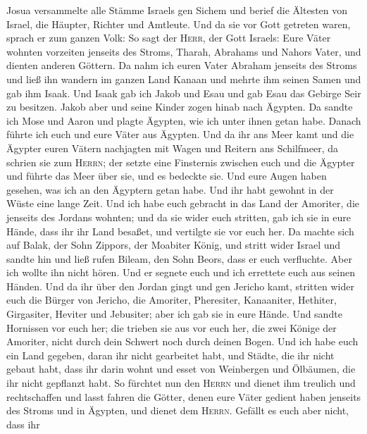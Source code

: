  Josua versammelte alle Stämme Israels gen Sichem und
berief die Ältesten von Israel, die Häupter, Richter und Amtleute. Und
da sie vor Gott getreten waren,  sprach er zum ganzen
Volk: So sagt der \textsc{Herr}, der Gott Israels: Eure Väter wohnten
vorzeiten jenseits des Stroms, Tharah, Abrahams und Nahors Vater, und
dienten anderen Göttern.  Da nahm ich euren Vater Abraham
jenseits des Stroms und ließ ihn wandern im ganzen Land Kanaan und
mehrte ihm seinen Samen und gab ihm Isaak.  Und Isaak gab
ich Jakob und Esau und gab Esau das Gebirge Seir zu besitzen. Jakob aber
und seine Kinder zogen hinab nach Ägypten.  Da sandte ich
Mose und Aaron und plagte Ägypten, wie ich unter ihnen getan habe.
 Danach führte ich euch und eure Väter aus Ägypten. Und da
ihr ans Meer kamt und die Ägypter euren Vätern nachjagten mit Wagen und
Reitern ans Schilfmeer,  da schrien sie zum
\textsc{Herrn}; der setzte eine Finsternis zwischen euch und die Ägypter
und führte das Meer über sie, und es bedeckte sie. Und eure Augen haben
gesehen, was ich an den Ägyptern getan habe. Und ihr habt gewohnt in der
Wüste eine lange Zeit.  Und ich habe euch gebracht in das
Land der Amoriter, die jenseits des Jordans wohnten; und da sie wider
euch stritten, gab ich sie in eure Hände, dass ihr ihr Land besaßet, und
vertilgte sie vor euch her.  Da machte sich auf Balak, der
Sohn Zippors, der Moabiter König, und stritt wider Israel und sandte hin
und ließ rufen Bileam, den Sohn Beors, dass er euch verfluchte.
 Aber ich wollte ihn nicht hören. Und er segnete euch und
ich errettete euch aus seinen Händen.  Und da ihr über
den Jordan gingt und gen Jericho kamt, stritten wider euch die Bürger
von Jericho, die Amoriter, Pheresiter, Kanaaniter, Hethiter, Girgasiter,
Heviter und Jebusiter; aber ich gab sie in eure Hände. 
Und sandte Hornissen vor euch her; die trieben sie aus vor euch her, die
zwei Könige der Amoriter, nicht durch dein Schwert noch durch deinen
Bogen.  Und ich habe euch ein Land gegeben, daran ihr
nicht gearbeitet habt, und Städte, die ihr nicht gebaut habt, dass ihr
darin wohnt und esset von Weinbergen und Ölbäumen, die ihr nicht
gepflanzt habt.  So fürchtet nun den \textsc{Herrn} und
dienet ihm treulich und rechtschaffen und lasst fahren die Götter, denen
eure Väter gedient haben jenseits des Stroms und in Ägypten, und dienet
dem \textsc{Herrn}.  Gefällt es euch aber nicht, dass ihr
